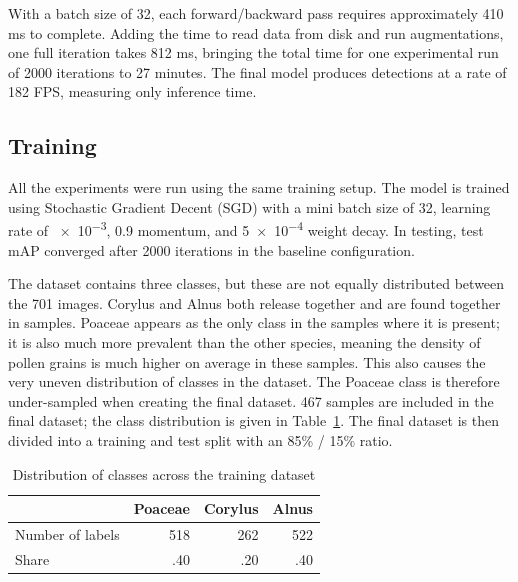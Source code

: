 With a batch size of 32, each forward/backward pass requires approximately 410 ms to complete.
Adding the time to read data from disk and run augmentations, one full iteration takes 812 ms, bringing the total time for one experimental run of 2000 iterations to 27 minutes.
The final model produces detections at a rate of 182 FPS, measuring only inference time.

\subsection{Training}
All the experiments were run using the same training setup.
The model is trained using Stochastic Gradient Decent (SGD) with a mini batch size of 32, learning rate of \num{e-3}, \num{0.9} momentum, and \num{5e-4} weight decay.
In testing, test mAP converged after 2000 iterations in the baseline configuration.

The dataset contains three classes, but these are not equally distributed between the 701 images.
Corylus and Alnus both release together and are found together in samples.
Poaceae appears as the only class in the samples where it is present; it is also much more prevalent than the other species, meaning the density of pollen grains is much higher on average in these samples.
This also causes the very uneven distribution of classes in the dataset.
The Poaceae class is therefore under-sampled when creating the final dataset.
467 samples are included in the final dataset; the class distribution is given in Table~\ref{tab:training-dataset}.
The final dataset is then divided into a training and test split with an 85\% / 15\% ratio.

\begin{table}[htbp]
  \caption[Class distribution across the final training dataset containing 467 sample images.]{Distribution of classes across the training dataset}\label{tab:training-dataset}
  \centering
  \begin{tabular}{lrrr} \toprule
                      & Poaceae & Corylus & Alnus \\ \midrule
    Number of labels  & 518    & 262     & 522 \\
    Share             & .40  & .20  & .40 \\ \bottomrule
  \end{tabular}
\end{table}

